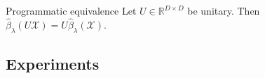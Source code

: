 \begin{proposition}{Programmatic equivalence}
\label{prop:lasso_program_equivalence}
 Let $U \in \mathbb R^{D \times D}$ be unitary.
 Then $\hat \beta_{\lambda}  (U \mathcal X) = U\hat \beta_{\lambda} (\mathcal X)$.
\end{proposition}



\subsection{Experiments}


